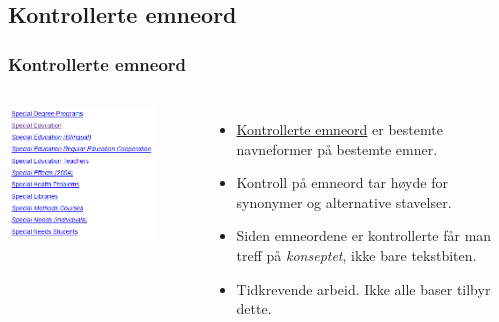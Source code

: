 \subsection{Kontrollerte emneord}
\begin{frame}
  \frametitle{Kontrollerte emneord}
  \begin{columns}
    \centering
    \includegraphics[width=0.8\textwidth]{../media/kontrollerte-emneord.png}

    \begin{itemize}
    \item \href{https://snl.no/emneord}{Kontrollerte emneord} er bestemte navneformer på bestemte emner.
    \item Kontroll på emneord tar høyde for synonymer og alternative stavelser.
    \item Siden emneordene er kontrollerte får man treff på \textit{konseptet}, ikke bare tekstbiten.
    \item Tidkrevende arbeid. Ikke alle baser tilbyr dette.
    \end{itemize}
  \end{columns}
\end{frame}

